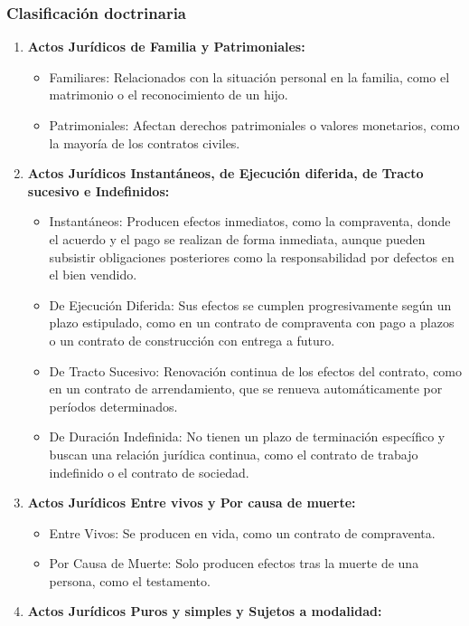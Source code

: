 \documentclass{templateNote}
\begin{document}
\subsubsection{Clasificación doctrinaria}
\begin{enumerate}
    \item \textbf{Actos Jurídicos de Familia y Patrimoniales:}
    \begin{itemize}
        \item Familiares: Relacionados con la situación personal en la familia, como el matrimonio o el reconocimiento de un hijo.
        \item Patrimoniales: Afectan derechos patrimoniales o valores monetarios, como la mayoría de los contratos civiles.
    \end{itemize}
    \item \textbf{Actos Jurídicos Instantáneos, de Ejecución diferida, de Tracto sucesivo e Indefinidos:}
    \begin{itemize}
        \item Instantáneos: Producen efectos inmediatos, como la compraventa, donde el acuerdo y el pago se realizan de forma inmediata, aunque pueden subsistir obligaciones posteriores como la responsabilidad por defectos en el bien vendido.
        \item De Ejecución Diferida: Sus efectos se cumplen progresivamente según un plazo estipulado, como en un contrato de compraventa con pago a plazos o un contrato de construcción con entrega a futuro.
        \item De Tracto Sucesivo: Renovación continua de los efectos del contrato, como en un contrato de arrendamiento, que se renueva automáticamente por períodos determinados.
        \item De Duración Indefinida: No tienen un plazo de terminación específico y buscan una relación jurídica continua, como el contrato de trabajo indefinido o el contrato de sociedad.
    \end{itemize}
    \item \textbf{Actos Jurídicos Entre vivos y Por causa de muerte:}
    \begin{itemize}
        \item Entre Vivos: Se producen en vida, como un contrato de compraventa.
        \item Por Causa de Muerte: Solo producen efectos tras la muerte de una persona, como el testamento.
    \end{itemize}
    \item \textbf{Actos Jurídicos Puros y simples y Sujetos a modalidad:}

\end{enumerate}
\end{document}
